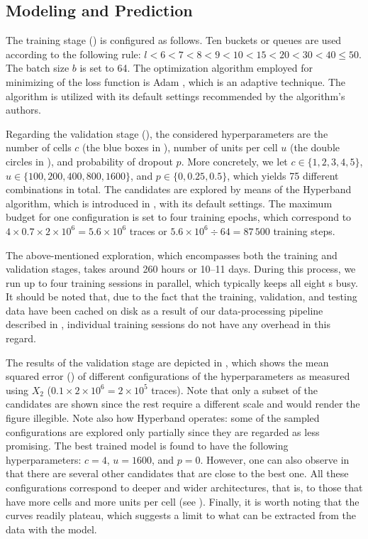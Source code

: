 \subsection{Modeling and Prediction}
The training stage () is configured as follows. Ten buckets or
queues are used according to the following rule: $l < 6 < 7 < 8 < 9 < 10 < 15 <
20 < 30 < 40 \leq 50$. The batch size $b$ is set to 64. The optimization
algorithm employed for minimizing of the loss function is Adam
\cite{kingma2014}, which is an adaptive technique. The algorithm is utilized
with its default settings recommended by the algorithm's authors.

Regarding the validation stage (), the considered
hyperparameters are the number of cells $c$ (the blue boxes in ),
number of units per cell $u$ (the double circles in ), and
probability of dropout $p$. More concretely, we let $c \in \{1, 2, 3, 4, 5\}$,
$u \in \{100, 200, 400, 800, 1600\}$, and $p \in \{0, 0.25, 0.5\}$, which yields
75 different combinations in total. The candidates are explored by means of the
Hyperband algorithm, which is introduced in , with its default
settings. The maximum budget for one configuration is set to four training
epochs, which correspond to $4 \times 0.7 \times 2 \times 10^6 = 5.6 \times
10^6$ traces or $5.6 \times 10^6 \div 64 = 87\,500$ training steps.

The above-mentioned exploration, which encompasses both the training and
validation stages, takes around 260 hours or 10--11 days. During this process,
we run up to four training sessions in parallel, which typically keeps all eight
s busy. It should be noted that, due to the fact that the training,
validation, and testing data have been cached on disk as a result of our
data-processing pipeline described in , individual training sessions
do not have any overhead in this regard.



The results of the validation stage are depicted in , which
shows the mean squared error () of different configurations of the
hyperparameters as measured using $X_2$ ($0.1 \times 2 \times 10^6 = 2 \times
10^5$ traces). Note that only a subset of the candidates are shown since the
rest require a different scale and would render the figure illegible. Note also
how Hyperband operates: some of the sampled configurations are explored only
partially since they are regarded as less promising. The best trained model is
found to have the following hyperparameters: $c = 4$, $u = 1600$, and $p = 0$.
However, one can also observe in  that there are several other
candidates that are close to the best one. All these configurations correspond
to deeper and wider architectures, that is, to those that have more cells and
more units per cell (see ). Finally, it is worth noting that the
curves readily plateau, which suggests a limit to what can be extracted from the
data with the model.

